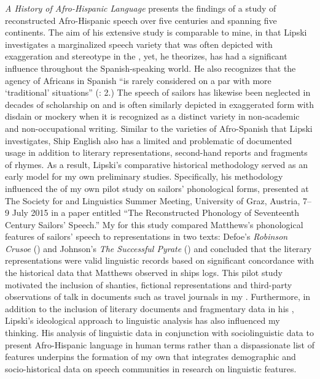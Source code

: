  \textit{A History of Afro-Hispanic Language} presents the findings of a study of reconstructed Afro-Hispanic speech over five centuries and spanning five continents. The aim of his extensive study is comparable to mine, in that Lipski investigates a marginalized speech variety that was often depicted with exaggeration and stereotype in the , yet, he theorizes, has had a significant influence throughout the Spanish-speaking world. He also recognizes that the agency of Africans in Spanish  “is rarely considered on a par with more ‘traditional’  situations” (\citealt{Lipski2005}: 2.) The speech of sailors has likewise been neglected in decades of scholarship on  and is often similarly depicted in exaggerated form with disdain or mockery when it is recognized as a distinct variety in non-academic and non-occupational writing. Similar to the varieties of Afro-Spanish that Lipski investigates, Ship English also has a limited and problematic  of documented usage in addition to literary representations, second-hand reports and fragments of rhymes. As a result, Lipski’s comparative historical methodology served as an early model for my own preliminary studies. Specifically, his methodology influenced the  of my own pilot study on  sailors’ phonological forms, presented at The Society for  and  Linguistics Summer Meeting, University of Graz, Austria, 7--9 July {2015} in a paper entitled “The Reconstructed Phonology of Seventeenth Century Sailors’ Speech.” My  for this study compared Matthews’s phonological features of  sailors’ speech to representations in two texts: Defoe’s \textit{Robinson Crusoe} (\citeyear{Defoe1719}) and Johnson’s \textit{The Successful Pyrate} (\citeyear*{Johnson1713}) and concluded that the literary representations were valid linguistic records based on significant concordance with the historical data that Matthews observed in ships logs. This pilot study motivated the inclusion of shanties, fictional representations and third-party observations of  talk in documents such as travel journals in my . Furthermore, in addition to the inclusion of literary documents and fragmentary data in his , Lipski’s ideological approach to linguistic analysis has also influenced my thinking. His analysis of linguistic data in conjunction with sociolinguistic data to present Afro-Hispanic language in human terms rather than a dispassionate list of features underpins the formation of my own  that integrates demographic and socio-historical data on speech communities in research on linguistic features.

